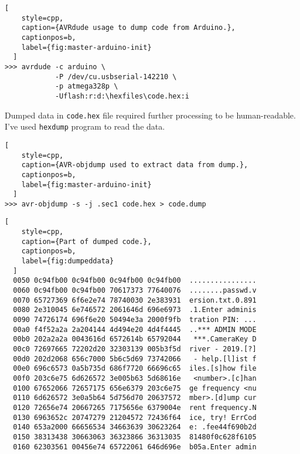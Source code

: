 \begin{minipage}{\linewidth}
  \begin{lstlisting}[
    style=cpp,
    caption={AVRdude usage to dump code from Arduino.},
    captionpos=b,
    label={fig:master-arduino-init}
  ]
>>> avrdude -c arduino \
            -P /dev/cu.usbserial-142210 \
            -p atmega328p \
            -Uflash:r:d:\hexfiles\code.hex:i
  \end{lstlisting}
\end{minipage}
Dumped data in \texttt{code.hex} file required further processing to be human-readable. I've used \texttt{hexdump} program to read the data.

\begin{minipage}{\linewidth}
  \begin{lstlisting}[
    style=cpp,
    caption={AVR-objdump used to extract data from dump.},
    captionpos=b,
    label={fig:master-arduino-init}
  ]
>>> avr-objdump -s -j .sec1 code.hex > code.dump
  \end{lstlisting}
\end{minipage}

\begin{minipage}{\linewidth}
  \begin{lstlisting}[
    style=cpp,
    caption={Part of dumped code.},
    captionpos=b,
    label={fig:dumpeddata}
  ]
  0050 0c94fb00 0c94fb00 0c94fb00 0c94fb00  ................
  0060 0c94fb00 0c94fb00 70617373 77640076  ........passwd.v
  0070 65727369 6f6e2e74 78740030 2e383931  ersion.txt.0.891
  0080 2e310045 6e746572 2061646d 696e6973  .1.Enter adminis
  0090 74726174 696f6e20 50494e3a 2000f9fb  tration PIN: ...
  00a0 f4f52a2a 2a204144 4d494e20 4d4f4445  ..*** ADMIN MODE
  00b0 202a2a2a 0043616d 6572614b 65792044   ***.CameraKey D
  00c0 72697665 72202d20 32303139 005b3f5d  river - 2019.[?]
  00d0 202d2068 656c7000 5b6c5d69 73742066   - help.[l]ist f
  00e0 696c6573 0a5b735d 686f7720 66696c65  iles.[s]how file
  00f0 203c6e75 6d626572 3e005b63 5d68616e   <number>.[c]han
  0100 67652066 72657175 656e6379 203c6e75  ge frequency <nu
  0110 6d626572 3e0a5b64 5d756d70 20637572  mber>.[d]ump cur
  0120 72656e74 20667265 7175656e 6379004e  rent frequency.N
  0130 6963652c 20747279 21204572 72436f64  ice, try! ErrCod
  0140 653a2000 66656534 34663639 30623264  e: .fee44f690b2d
  0150 38313438 30663063 36323866 36313035  81480f0c628f6105
  0160 62303561 00456e74 65722061 646d696e  b05a.Enter admin
  \end{lstlisting}
\end{minipage}

